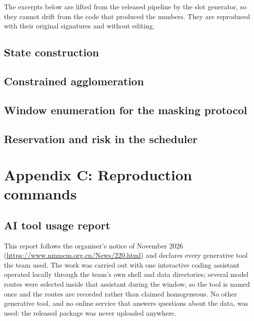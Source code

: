 \documentclass{swmcmthesis}
\begin{document}
The excerpts below are lifted from the released pipeline by the slot generator, so
they cannot drift from the code that produced the numbers. They are reproduced with
their original signatures and without editing.

\subsection*{State construction}



\subsection*{Constrained agglomeration}



\subsection*{Window enumeration for the masking protocol}



\subsection*{Reservation and risk in the scheduler}



\section*{Appendix C: Reproduction commands}
\label{app:repro}



\subsection*{AI tool usage report}

This report follows the organiser's notice of November 2026
(\url{https://www.nmmcm.org.cn/News/220.html}) and declares every generative tool the
team used. The work was carried out with one interactive coding assistant operated
locally through the team's own shell and data directories; several model routes were
selected inside that assistant during the window, so the tool is named once and the
routes are recorded rather than claimed homogeneous. No other generative tool, and no
online service that answers questions about the data, was used: the released package
was never uploaded anywhere.
\end{document}
